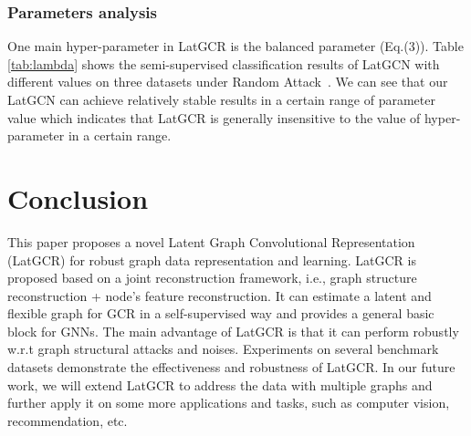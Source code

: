 \documentclass{article}
\begin{document}
\subsubsection{Parameters analysis}

One main hyper-parameter in LatGCR is the balanced parameter  (Eq.(3)).
Table \ref{tab:lambda} shows the semi-supervised classification results of LatGCN with different  values on three datasets under  Random Attack~\cite{jin2020adversarial}.
We can see that our LatGCN can achieve relatively stable results in a certain range of parameter  value which indicates that LatGCR is generally insensitive to the value of hyper-parameter  in a certain range.



\section{Conclusion}

This paper proposes a novel Latent Graph Convolutional Representation (LatGCR) for robust graph data representation and learning.
LatGCR is proposed based on a joint reconstruction framework, i.e., graph structure reconstruction + node's feature reconstruction.
 It  can estimate a latent and flexible graph for GCR in a self-supervised way and provides a general basic block for GNNs.
The main advantage of LatGCR is that it can perform robustly w.r.t graph structural attacks and noises.
Experiments on several benchmark datasets demonstrate the effectiveness and robustness of LatGCR.
In our future work, we will extend LatGCR to address the data with multiple graphs and further apply it on some more applications and tasks, such as computer vision, recommendation, etc.
\end{document}
